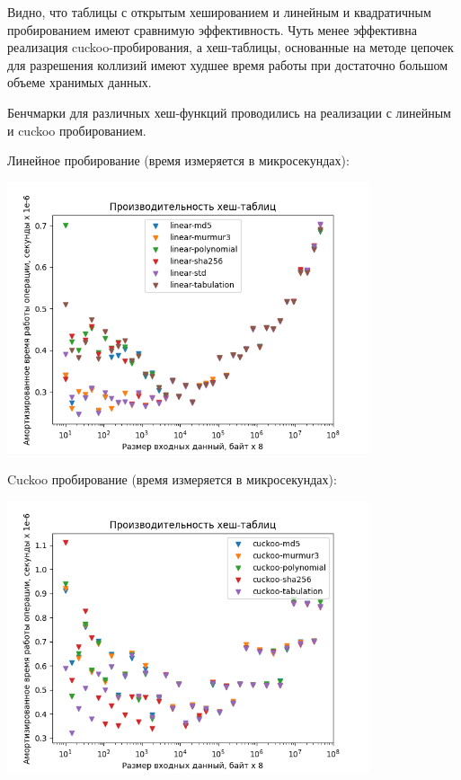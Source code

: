 \documentclass[18pt]{article}
\begin{document}
\par
Видно, что таблицы с открытым хешированием и 
линейным и квадратичным пробированием имеют сравнимую эффективность.
Чуть менее эффективна реализация cuckoo-пробирования, а хеш-таблицы,
основанные на методе цепочек для разрешения коллизий имеют худшее время работы
при достаточно большом объеме хранимых данных.

\par
Бенчмарки для различных хеш-функций проводились на реализации с линейным и
cuckoo пробированием.

Линейное пробирование (время измеряется в микросекундах):
\begin{center}
	\includegraphics[width=0.8\textwidth]{lineal-table-plot.png}
\end{center}

Cuckoo пробирование (время измеряется в микросекундах):
\begin{center}
	\includegraphics[width=0.8\textwidth]{cuckoo-table-plot.png}
\end{center}
\end{document}
